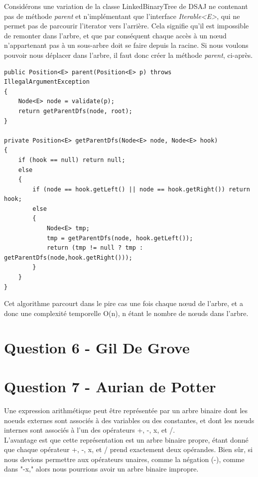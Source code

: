 \documentclass[10pt,a4paper]{article}
\begin{document}
	Considérons une variation de la classe LinkedBinaryTree de DSAJ ne contenant pas de méthode \textit{parent} et n'implémentant que l'interface \textit{Iterable<E>}, qui ne permet pas de parcourir l'iterator vers l'arrière.
	Cela signifie qu'il est impossible de remonter dans l'arbre, et que par conséquent chaque accès à un nœud n'appartenant pas à un sous-arbre doit se faire depuis la racine.
	Si nous voulons pouvoir nous déplacer dans l'arbre, il faut donc créer la méthode \textit{parent}, ci-après.
	
	\begin{lstlisting}
public Position<E> parent(Position<E> p) throws IllegalArgumentException
{
	Node<E> node = validate(p);
	return getParentDfs(node, root);
}

private Position<E> getParentDfs(Node<E> node, Node<E> hook)
{
	if (hook == null) return null;
	else
	{
		if (node == hook.getLeft() || node == hook.getRight()) return hook;
		else
		{
			Node<E> tmp;
			tmp = getParentDfs(node, hook.getLeft());
			return (tmp != null ? tmp : getParentDfs(node,hook.getRight()));
		}
	}
}
	\end{lstlisting}
	
	Cet algorithme parcourt dans le pire cas une fois chaque nœud de l'arbre, et a donc une complexité temporelle O(n), n étant le nombre de nœuds dans l'arbre.

\section*{Question 6 - Gil De Grove}


\section*{Question 7 - Aurian de Potter}

Une expression arithmétique peut être représentée par un arbre binaire dont les noeuds externes sont associés à des variables ou des constantes, et dont les nœuds internes sont associés à l'un des opérateurs +, -, x, et /.\\

L'avantage est que cette représentation est un arbre binaire propre, étant donné que chaque opérateur +, -, x, et / prend exactement deux opérandes. Bien sûr, si nous devions permettre aux opérateurs unaires, comme la négation (-), comme dans "-x," alors nous pourrions avoir un arbre binaire impropre.\\
\end{document}
